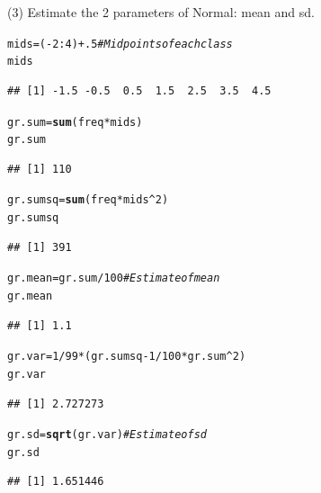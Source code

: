 \documentclass[t,xcolor=pdftex,dvipsnames,table]{beamer}\usepackage[]{graphicx}\usepackage[]{color}
\makeatletter
\newcommand{\hlnum}[1]{\textcolor[rgb]{0.686,0.059,0.569}{#1}}%
\newcommand{\hlcom}[1]{\textcolor[rgb]{0.678,0.584,0.686}{\textit{#1}}}%
\newcommand{\hlopt}[1]{\textcolor[rgb]{0,0,0}{#1}}%
\newcommand{\hlstd}[1]{\textcolor[rgb]{0.345,0.345,0.345}{#1}}%
\newcommand{\hlkwb}[1]{\textcolor[rgb]{0.69,0.353,0.396}{#1}}%
\newcommand{\hlkwd}[1]{\textcolor[rgb]{0.737,0.353,0.396}{\textbf{#1}}}%
\newenvironment{kframe}{%
 \def\at@end@of@kframe{}%
 \ifinner\ifhmode%
  \def\at@end@of@kframe{\end{minipage}}%
  \begin{minipage}{\columnwidth}%
 \fi\fi%
 \def\FrameCommand##1{\hskip\@totalleftmargin \hskip-\fboxsep
 \colorbox{shadecolor}{##1}\hskip-\fboxsep
     \hskip-\linewidth \hskip-\@totalleftmargin \hskip\columnwidth}%
 \MakeFramed {\advance\hsize-\width
   \@totalleftmargin\z@ \linewidth\hsize
   \@setminipage}}%
 {\par\unskip\endMakeFramed%
 \at@end@of@kframe}
\newenvironment{knitrout}{}{} %
\makeatother
\begin{document}
\begin{frame}[fragile]{}
(3) Estimate the 2 parameters of Normal: mean and sd.
\begin{knitrout}
\color{fgcolor}\begin{kframe}
\begin{alltt}
\hlstd{mids}\hlkwb{=}\hlstd{(}\hlopt{-}\hlnum{2}\hlopt{:}\hlnum{4}\hlstd{)}\hlopt{+}\hlnum{.5}    \hlcom{#Midpoints of each class}
\hlstd{mids}
\end{alltt}
\begin{verbatim}
## [1] -1.5 -0.5  0.5  1.5  2.5  3.5  4.5
\end{verbatim}
\begin{alltt}
\hlstd{gr.sum}\hlkwb{=}\hlkwd{sum}\hlstd{(freq}\hlopt{*}\hlstd{mids)}
\hlstd{gr.sum}
\end{alltt}
\begin{verbatim}
## [1] 110
\end{verbatim}
\begin{alltt}
\hlstd{gr.sumsq}\hlkwb{=}\hlkwd{sum}\hlstd{(freq}\hlopt{*}\hlstd{mids}\hlopt{^}\hlnum{2}\hlstd{)}
\hlstd{gr.sumsq}
\end{alltt}
\begin{verbatim}
## [1] 391
\end{verbatim}
\end{kframe}
\end{knitrout}
\end{frame}

\begin{frame}[fragile]{}
\begin{knitrout}
\color{fgcolor}\begin{kframe}
\begin{alltt}
\hlstd{gr.mean}\hlkwb{=}\hlstd{gr.sum}\hlopt{/}\hlnum{100}   \hlcom{#Estimate of mean}
\hlstd{gr.mean}
\end{alltt}
\begin{verbatim}
## [1] 1.1
\end{verbatim}
\begin{alltt}
\hlstd{gr.var}\hlkwb{=}\hlnum{1}\hlopt{/}\hlnum{99}\hlopt{*} \hlstd{(gr.sumsq} \hlopt{-} \hlnum{1}\hlopt{/}\hlnum{100}\hlopt{*} \hlstd{gr.sum}\hlopt{^}\hlnum{2}\hlstd{)}
\hlstd{gr.var}
\end{alltt}
\begin{verbatim}
## [1] 2.727273
\end{verbatim}
\begin{alltt}
\hlstd{gr.sd}\hlkwb{=}\hlkwd{sqrt}\hlstd{(gr.var)}   \hlcom{#Estimate of sd}
\hlstd{gr.sd}
\end{alltt}
\begin{verbatim}
## [1] 1.651446
\end{verbatim}
\end{kframe}
\end{knitrout}
\end{frame}
\end{document}
